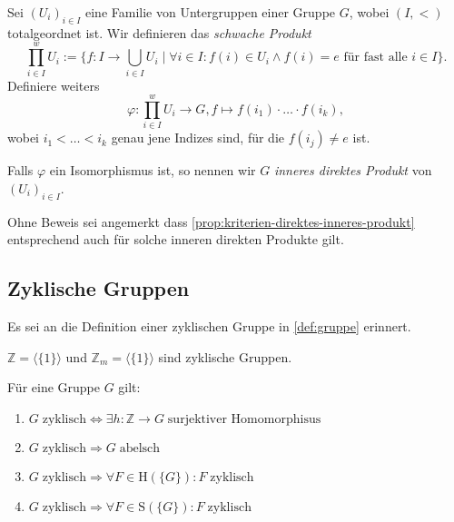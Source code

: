 \begin{remark}
    Sei $(U_i)_{i \in I}$ eine Familie von Untergruppen einer Gruppe $G$, wobei $(I, <)$ totalgeordnet ist. Wir definieren das \emph{schwache Produkt} 
    $$ \prod_{i \in I}^w U_i := \{ f : I \to \bigcup_{i \in I} U_i \mid \forall i \in I: f(i) \in U_i \land f(i) = e \textrm{ für fast alle } i \in I \}. $$
    Definiere weiters
    $$ \varphi : \prod_{i \in I}^w U_i \to G, f \mapsto f(i_1) \cdot \hdots \cdot f(i_k), $$
    wobei $i_1 < \hdots < i_k $ genau jene Indizes sind, für die $f(i_j) \neq e$ ist.

    Falls $\varphi$ ein Isomorphismus ist, so nennen wir $G$ \emph{inneres direktes Produkt} von $(U_i)_{i \in I}$.

    Ohne Beweis sei angemerkt dass \cref{prop:kriterien-direktes-inneres-produkt} entsprechend auch für solche inneren direkten Produkte gilt.
\end{remark}


\subsection{Zyklische Gruppen}

Es sei an die Definition einer zyklischen Gruppe in \cref{def:gruppe} erinnert.

\begin{example}
    $\mathbb{Z} = \langle \{1\}\rangle$ und $\mathbb{Z}_m = \langle\{1\}\rangle$ sind zyklische Gruppen.
\end{example}

\begin{proposition}\label{prop:zyklische_gruppen_1} Für eine Gruppe $G$ gilt:
    \begin{enumerate}
        \item $G\;\text{zyklisch} \Leftrightarrow \exists h: \mathbb{Z} \to G\;\text{surjektiver Homomorphisus}$
        \item $G\;\text{zyklisch} \Rightarrow G\;\text{abelsch}$
        \item $G\;\text{zyklisch} \Rightarrow \forall F \in \textrm{H}(\{G\}): F\;\text{zyklisch}$
        \item $G\;\text{zyklisch} \Rightarrow \forall F \in \textrm{S}(\{G\}): F\;\text{zyklisch}$
    \end{enumerate}
\end{proposition}

